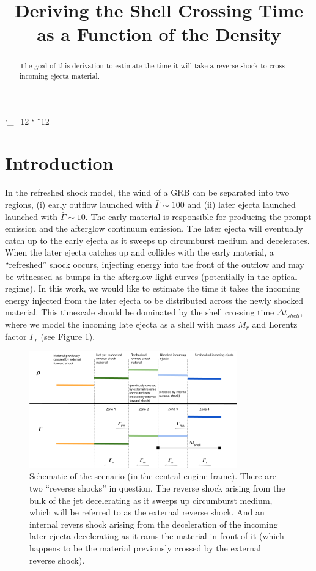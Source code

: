 \documentclass[linenumbers,twocolumn]{aastex631}
\def\upsubscripts{\catcode`\_=12 } \def\normalsubscripts{\catcode`\_=8 }
\def\upsupscripts{\catcode`\^=12 } \def\normalsupscripts{\catcode`\^=7 }
\begin{document}
\upsubscripts
\upsupscripts

\title{Deriving the Shell Crossing Time as a Function of the Density}


\begin{abstract}
The goal of this derivation to estimate the time it will take a reverse shock to cross incoming ejecta material.

\end{abstract}

\section{Introduction}
{
    In the refreshed shock model, the wind of a GRB can be separated into two regions, (i) early outflow launched with $\bar{\Gamma}\sim100$ and (ii) later ejecta launched launched with $\bar{\Gamma}\sim10$. The early material is responsible for producing the prompt emission and the afterglow continuum emission. The later ejecta will eventually catch up to the early ejecta as it sweeps up circumburst medium and decelerates. When the later ejecta catches up and collides with the early material, a ``refreshed'' shock occurs, injecting energy into the front of the outflow and may be witnessed as bumps in the afterglow light curves (potentially in the optical regime). In this work, we would like to estimate the time it takes the incoming energy injected from the later ejecta to be distributed across the newly shocked material. This timescale should be dominated by the shell crossing time $\Delta t_{shell}$, where we model the incoming late ejecta as a shell with mass $M_{r}$ and Lorentz factor $\Gamma_{r}$ (see Figure \ref{fig: schematic}).

    \begin{figure}[t!]
        \centering
        \includegraphics[width=0.8\textwidth]{schematic.png}
        \caption{Schematic of the scenario (in the central engine frame). There are two ``reverse shocks'' in question. The reverse shock arising from the bulk of the jet decelerating as it sweeps up circumburst medium, which will be referred to as the external reverse shock. And an internal revers shock arising from the deceleration of the incoming later ejecta decelerating as it rams the material in front of it (which happens to be the material previously crossed by the external reverse shock).}
        \label{fig: schematic}
    \end{figure}

}
\end{document}
